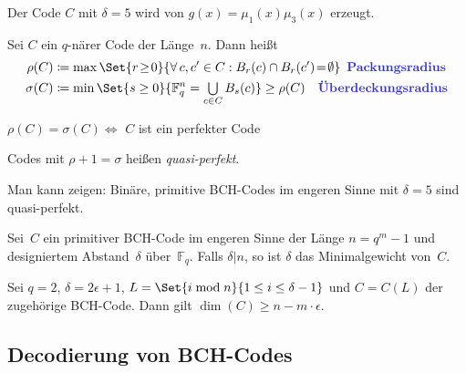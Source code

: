 \documentclass{cheat-sheet}
\newcommand{\F}{\mathbb{F}} %
\newcommand{\divides}{|} %
\begin{document}
\begin{bem}
  Der Code $C$ mit $\delta = 5$ wird von $g(x) = \mu_1(x) \mu_3(x)$ erzeugt.
\end{bem}

\begin{defn}
  Sei $C$ ein $q$-närer Code der Länge~$n$.
  Dann heißt
  \begin{align*}
    \rho(C) & \coloneqq \max \Set{r \!\geq\! 0}{\forall \, c, c' \in C : B_r(c) \cap B_r(c') \!=\! \emptyset} \enspace
    \text{\emph{Packungsradius}} \\
    \sigma(C) & \coloneqq \min \Set{s \geq 0}{\F_q^n = \bigcup_{c \in C} B_s(c)} \geq \rho(C) \quad
    \text{\emph{Überdeckungsradius}}
  \end{align*}
\end{defn}

\begin{bem}
  $\rho(C) = \sigma(C) \iff $ $C$ ist ein perfekter Code
\end{bem}

\begin{defn}
  Codes mit $\rho + 1 = \sigma$ heißen \emph{quasi-perfekt}.
\end{defn}

\begin{bsp}
  Man kann zeigen: Binäre, primitive BCH-Codes im engeren Sinne mit $\delta = 5$ sind quasi-perfekt.
\end{bsp}

\begin{prop}
  Sei~$C$ ein primitiver BCH-Code im engeren Sinne der Länge $n = q^m - 1$ und designiertem Abstand~$\delta$ über~$\F_q$.
  Falls $\delta \divides n$, so ist $\delta$ das Minimalgewicht von~$C$.
\end{prop}


\begin{satz}
  Sei $q = 2$, $\delta = 2 \epsilon + 1$, $L = \Set{i \bmod{n}}{1 \leq i \leq \delta - 1}$ und $C = C(L)$ der zugehörige BCH-Code.
  Dann gilt $\dim(C) \geq n - m \cdot \epsilon$.
\end{satz}


\subsection{Decodierung von BCH-Codes}
\end{document}
